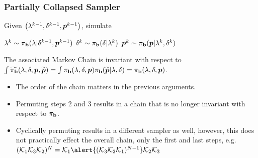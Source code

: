 \documentclass[]{beamer}
\newcommand{\K}{\ensuremath{\mathcal K}}
\renewcommand{\tilde}{\widetilde}
\newcommand{\bm}[1]{\mbox{\boldmath$#1$}}
\newcommand{\vect}[1]{\bm{#1}}
\begin{document}
\begin{frame}[t]
  \frametitle{Partially Collapsed Sampler}
{\small
Given $\left(\lambda^{k-1},\delta^{k-1},\vect p^{k-1}\right)$, simulate
\begin{center}
\begin{algorithmic}[1]
  \STATE $\lambda^k \sim \pib(\lambda|\delta^{k-1},\vect p^{k-1})$
  \STATE $\delta^{k} \sim \pi_{\mathbf b}(\delta|\lambda^k)$ 
  \STATE $\vect p^{k} \sim \pib(\vect p|\lambda^k,\delta^k)$
\end{algorithmic}
\end{center}
The associated Markov Chain is invariant with respect to $\int \tilde \pib(\lambda,\delta,\vect p,\tilde{\vect p}) = \int \pib(\lambda,\delta,\vect p)\pib(\tilde{\vect p}| \lambda,\delta) = \pib(\lambda,\delta,\vect p)$.
}

\begin{itemize}
  \itemsep 1.2em
  \item The order of the chain matters in the previous arguments.
  \item \alert{Permuting} steps 2 and 3 results in a chain that is no longer \alert{invariant} with respect to $\pi_{\mathbf b}$.
  \item \alert{Cyclically permuting} results in a different sampler as well, however, this does not practically effect the overall chain, only the first and last steps, e.g. $(\K_1\K_3\K_2)^N = \K_1\alert{(\K_3\K_2\K_1)^{N-1}}\K_2\K_3$
\end{itemize}
\end{frame}
\end{document}
